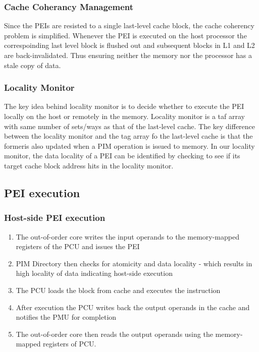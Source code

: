 \documentclass[a4paper,12pt, final]{report}
\begin{document}
\subsubsection{Cache Coherancy Management}
Since the PEIs are resisted to a single last-level cache block, the cache
coherency problem is simplified. Whenever the PEI is executed on the host
processor the correspoinding last level block is flushed out and subsequent
blocks in L1 and L2 are back-invalidated. Thus ensuring neither the memory nor
the processor has a stale copy of data.

\subsubsection{Locality Monitor}
The key idea behind locality monitor is to decide whether to execute the PEI
locally on the host or remotely in the memory. Locality monitor is a taf array
with same number of sets/ways as that of the last-level cache. The key
difference between the locality monitor and the tag array fo the last-level
cache is that the formeris also updated when a PIM operation is issued to
memory. In our locality monitor, the data locality of a PEI can be
identified by checking to see if its target cache block address
hits in the locality monitor.

\subsection{PEI execution}
\subsubsection{Host-side PEI execution}
\begin{enumerate}
  \setlength\itemsep{0em}
  \item The out-of-order core writes the input operands to the memory-mapped
    registers of the PCU and issues the PEI
  \item PIM Directory then checks for atomicity and data locality - which
    results in high locality of data indicating host-side execution
  \item The PCU loads the block from cache and executes the instruction
  \item After execution the PCU writes back the output operands in the cache
    and notifies the PMU for completion
  \item The out-of-order core then reads the output operands using the
    memory-mapped registers of PCU.
\end{enumerate}
\end{document}
